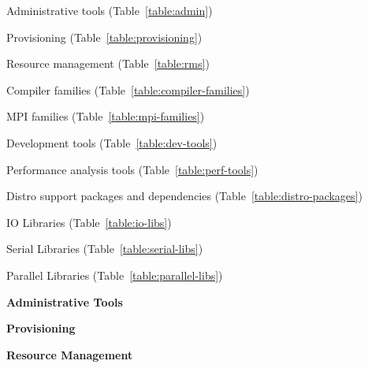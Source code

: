 \vspace*{0.1cm}

\begin{itemize*}
\item Administrative tools (Table~\ref{table:admin})
\item Provisioning (Table~\ref{table:provisioning})
\item Resource management (Table~\ref{table:rms})
\item Compiler families (Table~\ref{table:compiler-families})
\item MPI families (Table~\ref{table:mpi-families})
\item Development tools (Table~\ref{table:dev-tools})
\item Performance analysis tools (Table~\ref{table:perf-tools})
\item Distro support packages and dependencies (Table~\ref{table:distro-packages})
\item IO Libraries (Table~\ref{table:io-libs})
\item Serial Libraries (Table~\ref{table:serial-libs})
\item Parallel Libraries (Table~\ref{table:parallel-libs})
\end{itemize*}

\newcommand{\firstColWidth}{3.5cm}
\newcommand{\secondColWidth}{1.5cm}

\vspace*{1.0cm}

\begin{table}[h]
\caption{\bf Administrative Tools} \vspace*{\captionSpace{}} \label{table:admin}

\end{table}
\vspace*{0.5cm}

\renewcommand{\firstColWidth}{4.5cm}
\renewcommand{\secondColWidth}{2.0cm}


\begin{table}[h!]
\caption{\bf Provisioning} \vspace*{\captionSpace{}} \label{table:provisioning}

\vspace*{\tabSpaceBot{}}
\end{table} 

\begin{table}[h!]
\caption{\bf Resource Management} \vspace*{\captionSpace{}} \label{table:rms}

\vspace*{\tabSpaceBot{}}
\end{table}

